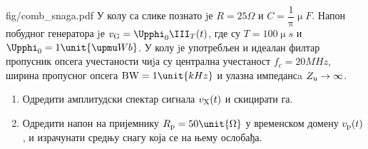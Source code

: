 \mnDifficult
\begin{slikaDesno}[.833]{fig/comb_snaga.pdf}
    \PID
    У колу са слике познато jе 
    $R = 25\unit{\Omega}$ и 
    $C = \dfrac{1}{\uppi} \unit{\upmu F}$.
    Напон побудног генератора jе 
    $v_{\rm G} = \Upphi_0 \III_T (t)$, где су 
    $T =100\unit{\upmu s}$ и 
    $\Upphi_0 = 1\unit{\upmu Wb}$. 
    У колу jе употребљен и идеалан филтар пропусник опсега учестаности чиjа су централна
    учестаност 
    $f_c = 20\unit{MHz}$, ширина пропусног опсега 
    ${\rm BW} = 1\unit{kHz}$ и улазна импедансa 
    $Z_{\rm u} \to \infty$. 
\end{slikaDesno}

\begin{enumerate}[label=(\alph*)]
    \item Одредити амплитудски спектар сигнала $v_{\rm X}(t)$ и скицирати га.
    \item Одредити напон на пријемнику $R_{\rm p} = 50\unit{\Omega}$ у временском домену $v_{\rm p}(t)$, и израчунати 
    средњу снагу која се на њему ослобађа. 
    
\end{enumerate}

\RESENJE

